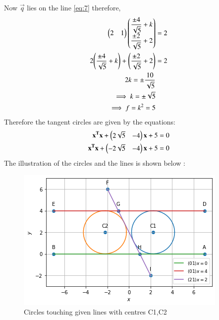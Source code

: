 \documentclass[journal,12pt,twocolumn]{IEEEtran}
\begin{document}
Now $\vec{q}$ lies on the line \eqref{eq:7} therefore,
\begin{align}
\begin{pmatrix}2 & 1\end{pmatrix}\begin{pmatrix}\dfrac{\pm 4}{\sqrt{5}} +k \\\dfrac{\pm 2}{\sqrt{5}} +2\end{pmatrix} &= 2 \\
2\Bigg(\dfrac{\pm 4}{\sqrt{5}} +k\Bigg) + \Bigg(\dfrac{\pm 2}{\sqrt{5}} +2\Bigg) &= 2\\\
2k = \pm \dfrac{10}{\sqrt{5}}\\
\implies k = \pm \sqrt{5} \\
\implies f = k^2 = 5
\end{align}
Therefore the tangent circles are given by the equations:
\begin{align}
\mathbf{x^T}\mathbf{x} + \begin{pmatrix}2\sqrt{5} & -4\end{pmatrix}\mathbf{x} + 5 &= 0 \\
\mathbf{x^T}\mathbf{x} + \begin{pmatrix}-2\sqrt{5} & -4\end{pmatrix}\mathbf{x} + 5 &= 0
\end{align}
The illustration of the circles and the lines is shown below :
\begin{figure}[!ht]
       \centering
    \includegraphics[width=\columnwidth] {Assignment_3_Fig_1.png}
    \caption{Circles touching given lines with centres C1,C2}
    \label{Tangent circles to 3 given lines}
\end{figure}
\end{document}
